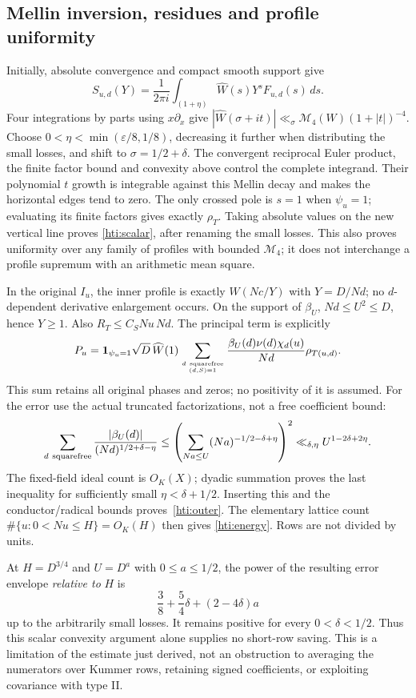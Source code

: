 \documentclass[11pt]{article}
\theoremstyle{definition}\newtheorem{definition}[theorem]{Definition}
\theoremstyle{remark}\newtheorem{remark}[theorem]{Remark}
\begin{document}
\subsection{Mellin inversion, residues and profile uniformity}
Initially, absolute convergence and compact smooth support give
\[
 S_{u,d}(Y)=\frac1{2\pi i}\int_{(1+\eta)}
       \widehat W(s)Y^sF_{u,d}(s)\,ds.
\]
Four integrations by parts using $x\partial_x$ give
$|\widehat W(\sigma+it)|\ll_\sigma\mathcal M_4(W)(1+|t|)^{-4}$.
Choose $0<\eta<\min(\varepsilon/8,1/8)$, decreasing it further
when distributing the small losses, and shift to
$\sigma=1/2+\delta$. The convergent reciprocal Euler product, the finite
factor bound and convexity above control the complete integrand.
Their polynomial $t$ growth is integrable against this Mellin decay and
makes the horizontal edges tend to zero. The only crossed pole is $s=1$
when $\psi_u=1$; evaluating its finite factors gives exactly $\rho_T$.
Taking absolute values on the new vertical line proves
\eqref{hti:scalar}, after renaming the small losses. This also proves
uniformity over any family of profiles with bounded $\mathcal M_4$;
it does not interchange a profile supremum with an arithmetic mean square.

In the original $I_u$, the inner profile is exactly $W(Nc/Y)$ with
$Y=D/Nd$; no $d$-dependent derivative enlargement occurs. On the support
of $\beta_U$, $Nd\le U^2\le D$, hence $Y\ge1$. Also
$R_T\le C_S Nu\,Nd$. The principal term is explicitly
\[
 P_u=\mathbf1_{\psi_u=1}\sqrt D\,\widehat W(1)
 \sum_{d\ {\rm squarefree}\atop(d,S)=1}
       \frac{\beta_U(d)\nu(d)\chi_d(u)}{Nd}\rho_{T(u,d)}.
\]
This sum retains all original phases and zeros; no positivity of it is
assumed. For the error use the actual truncated factorizations, not a free
coefficient bound:
\[
 \sum_{d\ {\rm squarefree}}\frac{|\beta_U(d)|}{(Nd)^{1/2+\delta-\eta}}
 \le\left(\sum_{Na\le U}(Na)^{-1/2-\delta+\eta}\right)^2
 \ll_{\delta,\eta}U^{1-2\delta+2\eta}.
\]
The fixed-field ideal count is $O_K(X)$; dyadic summation proves the last
inequality for sufficiently small $\eta<\delta+1/2$. Inserting this and
the conductor/radical bounds proves~\eqref{hti:outer}.
The elementary lattice count $\#\{u:0<Nu\le H\}=O_K(H)$ then gives
\eqref{hti:energy}. Rows are not divided by units.

At $H=D^{3/4}$ and $U=D^a$ with $0\le a\le1/2$, the power of the
resulting error envelope \emph{relative to} $H$ is
\[
 \frac38+\frac54\delta+(2-4\delta)a
\]
up to the arbitrarily small losses. It remains positive for every
$0<\delta<1/2$. Thus this scalar convexity argument alone supplies no
short-row saving. This is a limitation of the estimate just derived,
not an obstruction to averaging the numerators over Kummer rows, retaining
signed coefficients, or exploiting covariance with type II.
\end{document}
